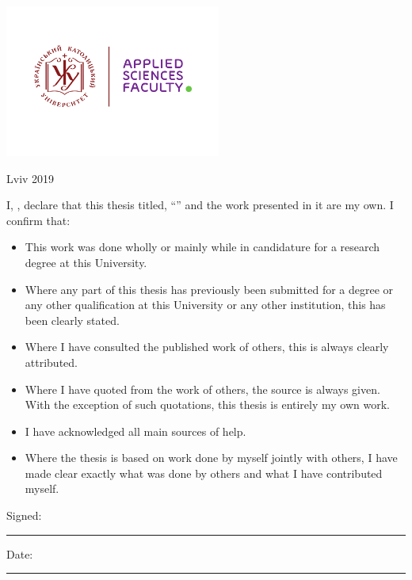 \documentclass[
11pt, %
oneside, %
english, %
singlespacing, %
headsepline, %
]{MastersDoctoralThesis} %
\begin{document}
\begin{titlepage}
\begin{center}
\vfill
\includegraphics[height=5cm]{UCU-Apps.png} %

\vfill
{\large Lviv 2019}\\[3cm] %
 
\vfill
\end{center}
\end{titlepage}


\begin{declaration}
\addchaptertocentry{\authorshipname} %
\noindent I, \authorname, declare that this thesis titled, \enquote{\ttitle} and the work presented in it are my own. I confirm that:

\begin{itemize} 
\item This work was done wholly or mainly while in candidature for a research degree at this University.
\item Where any part of this thesis has previously been submitted for a degree or any other qualification at this University or any other institution, this has been clearly stated.
\item Where I have consulted the published work of others, this is always clearly attributed.
\item Where I have quoted from the work of others, the source is always given. With the exception of such quotations, this thesis is entirely my own work.
\item I have acknowledged all main sources of help.
\item Where the thesis is based on work done by myself jointly with others, I have made clear exactly what was done by others and what I have contributed myself.\\
\end{itemize}
 
\noindent Signed:\\
\rule[0.5em]{25em}{0.5pt} %
 
\noindent Date:\\
\rule[0.5em]{25em}{0.5pt} %
\end{declaration}
\end{document}
